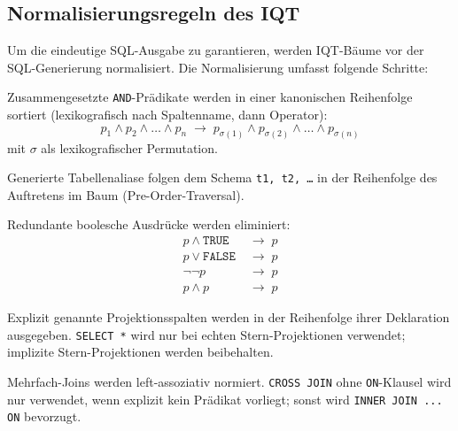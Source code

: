 \subsection{Normalisierungsregeln des IQT}
\label{subsec:iqt_norm}

Um die eindeutige SQL-Ausgabe zu garantieren, werden IQT-Bäume vor der
SQL-Generierung normalisiert. Die Normalisierung umfasst folgende Schritte:

\begin{regel}
\label{regel:pred_norm}
Zusammengesetzte \texttt{AND}-Prädikate werden in einer kanonischen
Reihenfolge sortiert (lexikografisch nach Spaltenname, dann Operator):
\[
  p_1 \wedge p_2 \wedge \ldots \wedge p_n \;\rightarrow\;
  p_{\sigma(1)} \wedge p_{\sigma(2)} \wedge \ldots \wedge p_{\sigma(n)}
\]
mit $\sigma$ als lexikografischer Permutation.
\end{regel}

\begin{regel}
\label{regel:alias_norm}
Generierte Tabellenaliase folgen dem Schema \texttt{t1, t2, \ldots} in
der Reihenfolge des Auftretens im Baum (Pre-Order-Traversal).
\end{regel}

\begin{regel}
\label{regel:bool_simp}
Redundante boolesche Ausdrücke werden eliminiert:
\begin{align*}
  p \wedge \mathtt{TRUE} &\;\rightarrow\; p \\
  p \vee \mathtt{FALSE}  &\;\rightarrow\; p \\
  \neg\neg p             &\;\rightarrow\; p \\
  p \wedge p             &\;\rightarrow\; p
\end{align*}
\end{regel}

\begin{regel}
\label{regel:select_order}
Explizit genannte Projekti\-ons\-spalten werden in der Reihenfolge ihrer
Deklaration ausgegeben. \texttt{SELECT *} wird nur bei echten Stern-Projektionen
verwendet; implizite Stern-Projektionen werden beibehalten.
\end{regel}

\begin{regel}
\label{regel:join_canon}
Mehrfach-Joins werden left-assoziativ normiert.
\texttt{CROSS JOIN} ohne \texttt{ON}-Klausel wird nur verwendet, wenn
explizit kein Prädikat vorliegt; sonst wird \texttt{INNER JOIN ... ON}
bevorzugt.
\end{regel}

